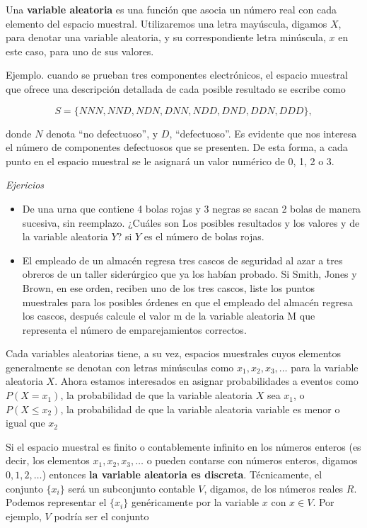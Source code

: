 \documentclass[11pt]{article}
\begin{document}
Una \textbf{variable aleatoria} es una función que asocia un número real
con cada elemento del espacio muestral. Utilizaremos una letra
mayúscula, digamos \(X\), para denotar una variable aleatoria, y su
correspondiente letra minúscula, \(x\) en este caso, para uno de sus
valores.

Ejemplo. cuando se prueban tres componentes electrónicos, el espacio
muestral que ofrece una descripción detallada de cada posible resultado
se escribe como

\[
S = \lbrace NNN, NND, NDN, DNN, NDD, DND, DDN, DDD\rbrace,
\]

donde \(N\) denota ``no defectuoso'', y \(D\), ``defectuoso''. Es
evidente que nos interesa el número de componentes defectuosos que se
presenten. De esta forma, a cada punto en el espacio muestral se le
asignará un valor numérico de 0, 1, 2 o 3.

\emph{Ejericios}

\begin{itemize}
\item
  De una urna que contiene 4 bolas rojas y 3 negras se sacan 2 bolas de
  manera sucesiva, sin reemplazo. ¿Cuáles son Los posibles resultados y
  los valores y de la variable aleatoria \(Y\)? si \(Y\) es el número de
  bolas rojas.
\item
  El empleado de un almacén regresa tres cascos de seguridad al azar a
  tres obreros de un taller siderúrgico que ya los habían probado. Si
  Smith, Jones y Brown, en ese orden, reciben uno de los tres cascos,
  liste los puntos muestrales para los posibles órdenes en que el
  empleado del almacén regresa los cascos, después calcule el valor m de
  la variable aleatoria M que representa el número de emparejamientos
  correctos.
\end{itemize}

Cada variables aleatorias tiene, a su vez, espacios muestrales cuyos
elementos generalmente se denotan con letras minúsculas como
\(x_{1}, x_{2}, x_{3},\ldots\) para la variable aleatoria \(X\). Ahora
estamos interesados en asignar probabilidades a eventos como
\(P (X = x_{1})\), la probabilidad de que la variable aleatoria \(X\)
sea \(x_{1}\), o \(P (X \leq x_{2})\), la probabilidad de que la
variable aleatoria variable es menor o igual que \(x_{2}\)

Si el espacio muestral es finito o contablemente infinito en los números
enteros (es decir, los elementos \(x_{1}, x_{2}, x_{3},\ldots\) o pueden
contarse con números enteros, digamos \(0, 1, 2,\ldots\)) entonces
\textbf{la variable aleatoria es discreta}. Técnicamente, el conjunto
\(\lbrace x_{i}\rbrace\) será un subconjunto contable \(V\), digamos, de
los números reales \(R\). Podemos representar el
\(\lbrace x_{i}\rbrace\) genéricamente por la variable \(x\) con
\(x \in V\). Por ejemplo, \(V\) podría ser el conjunto
\end{document}
